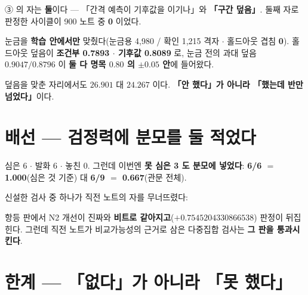 \documentclass{article}
\begin{document}
③ 의 자는 \textbf{둘}이다 --- 「간격 예측이 기후값을 이기나」와 \textbf{「구간 덮음」}.
둘째 자로 판정한 사이클이 900 노트 중 \textbf{0} 이었다.

눈금을 \textbf{학습 안에서만} 맞췄다(눈금용 4{,}980 / 확인 1{,}215 격자 $\cdot$ 홀드아웃 겹침 \textbf{0}).
홀드아웃 덮음이 \textbf{조건부 0.7893 $\cdot$ 기후값 0.8089} 로,
눈금 전의 과대 덮음 $0.9047/0.8796$ 이 \textbf{둘 다 명목 $0.80$ 의 $\pm0.05$ 안}에 들어왔다.

{덮음을 맞춘 자리에서도 $26.901$ 대 $24.267$ 이다.
\textbf{「안 했다」가 아니라 「했는데 반만 넘었다」}이다.}

\section{배선 --- 검정력에 분모를 둘 적었다}

심은 6 $\cdot$ 발화 6 $\cdot$ 놓친 0. 그런데 이번엔 \textbf{못 심은 3 도 분모에 넣었다}:
\textbf{6/6 $=$ 1.000}(심은 것 기준) 대 \textbf{6/9 $=$ 0.667}(관문 전체).

신설한 검사 중 하나가 직전 노트의 자를 무너뜨렸다:

{항등 판에서 N2 개선이 진짜와 \textbf{비트로 같아지고}($+0.7545204330866538$) 판정이 뒤집힌다.
그런데 직전 노트가 비교가능성의 근거로 삼은 다중집합 검사는 \textbf{그 판을 통과시킨다}.}

\section{한계 --- 「없다」가 아니라 「못 했다」}
\end{document}
